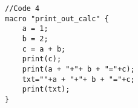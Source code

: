 \begin{lstlisting}
//Code 4
macro "print_out_calc" {
	a = 1;
	b = 2;
	c = a + b;
	print(c);
	print(a + "+"+ b + "="+c);
	txt=""+a + "+"+ b + "="+c;
	print(txt);
}




\end{lstlisting}